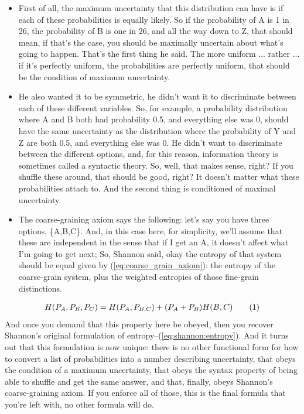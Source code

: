 \documentclass[]{article}
\newcommand\numberthis{\addtocounter{equation}{1}\tag{\theequation}}
\begin{document}
\begin{itemize}
	\item First of all, the maximum uncertainty that this distribution can have
	is if each of these probabilities is equally likely.
	So if the probability of A is 1 in 26, 	the probability of B is one in 26,
	and all the way down to Z, 	that should mean, if that's the case,
	you should be maximally uncertain 	about what's going to happen.
	That's the first thing he said.	The more uniform ... rather ...
	if it's perfectly uniform, 	the probabilities are perfectly uniform,
	that should be the condition of maximum uncertainty.
	\item He also wanted it to be symmetric,
	he didn't want it to discriminate
	between each of these different variables.
	So, for example,
	a probability distribution
	where A and B both had probability 0.5,
	and everything else was 0,
	should have the same uncertainty
	as the distribution where the probability
	of Y and Z are both 0.5,
	and everything else was 0.
	He didn't want to discriminate
	between the different options,
	and, for this reason, information theory
	is sometimes called a syntactic theory.
	So, well, that makes sense, right?
	If you shuffle these around,
	that should be good, right?
	It doesn't matter
	what these probabilities attach to.
	And the second thing
	is conditioned of maximal uncertainty.
	\item The coarse-graining axiom says the following: let's say you have three options, \{A,B,C\}.
	And, in this case here, for simplicity,
	we'll assume that these are independent
	in the sense that if I get an A,
	it doesn't affect
	what I'm going to get next;
	So, Shannon said, okay
	the entropy of that system
	should be equal given by (\ref{eq:coarse_grain_axiom}): the entropy of the coarse-grain system, plus the weighted entropies of those fine-grain distinctions.
\end{itemize}



\begin{align*}
H (P_A,P_B,P_C) = H(P_A,P_{B,C}) + (P_A+P_B)H(B,C) \numberthis \label{eq:coarse_grain_axiom}
\end{align*}
And once you demand
that this property here be obeyed, then you recover Shannon's
original formulation of entropy--(\ref{eq:shannon:entropy}). And it turns out
that this formulation is now unique: there is no other functional form
for how to convert a list of probabilities into a number describing uncertainty,
that obeys the condition of a maximum uncertainty, that obeys the syntax property
of being able to shuffle and get the same answer,
and that, finally, obeys Shannon's coarse-graining axiom. If you enforce all of those, this is the final formula that you're left with, no other formula will do.
\end{document}
